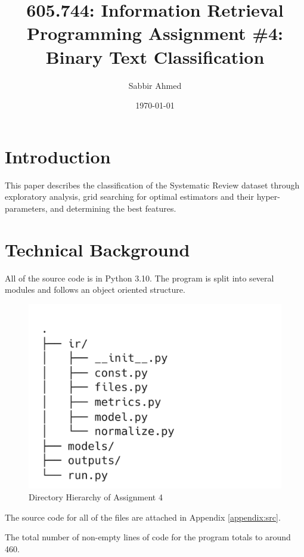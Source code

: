\documentclass[11pt]{article}
\title{605.744: Information Retrieval \\ Programming Assignment \#4: Binary Text Classification}
\author{Sabbir Ahmed}
\date{\today}
\begin{document}
\maketitle	
\tableofcontents
\clearpage
\newpage

\section*{Introduction}
This paper describes the classification of the Systematic Review dataset through exploratory analysis, grid searching for optimal estimators and their hyper-parameters, and determining the best features.

\section*{Technical Background}
All of the source code is in Python 3.10. The program is split into several modules and follows an object oriented structure.


\begin{figure}[!ht]
    \centering
    \includegraphics[scale=0.2]{statics/dirtree.png}
    \caption{Directory Hierarchy of Assignment 4}
\end{figure}

The source code for all of the files are attached in Appendix \ref{appendix:src}.

The total number of non-empty lines of code for the program totals to around 460.
\end{document}
